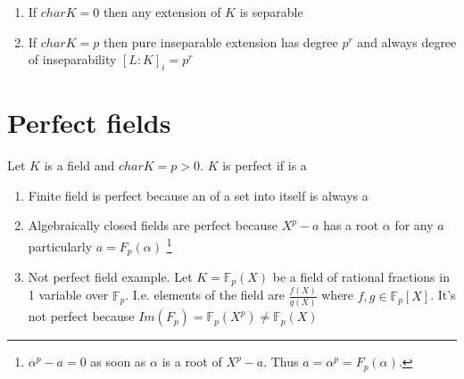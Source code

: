 \begin{remark}
  \begin{enumerate}
  \item If $char K = 0$ then any extension of $K$ is separable
  \item If $char K = p$ then pure inseparable extension has degree
    $p^r$ and always degree of inseparability
    $\left[L:K\right]_i = p^r$
  \end{enumerate}
\end{remark}

\section{Perfect fields}

\begin{definition}
  Let $K$ is a field and $char K = p > 0$. $K$ is perfect if
   is a 
  \label{def:perfectfield}
\end{definition}

\begin{example}
  \begin{enumerate}
    \item Finite field is perfect because an 
      of a set into itself is always a 
    \item Algebraically closed fields are perfect because
      $X^p - a$ has a root $\alpha$ for any $a$ particularly
      $a = F_p\left(\alpha\right)$
      \footnote{
        $\alpha^p -a =0$ as soon as $\alpha$ is a root of $X^p - a$.
        Thus $a = \alpha^p = F_p\left(\alpha\right)$.
      }
    \item Not perfect field example. Let
      $K=\mathbb{F}_p\left(X\right)$ be a field of rational fractions
      in 1 variable over $\mathbb{F}_p$. I.e. elements of the field
      are $\frac{f(X)}{g(X)}$ where
      $f,g \in \mathbb{F}_p\left[X\right]$. It's not perfect because
      $Im\left(F_p\right) = \mathbb{F}_p\left(X^p\right) \ne
      \mathbb{F}_p\left(X\right)$ \label{ex:lec3_notperfect}
  \end{enumerate}
  \label{ex:lec3_1}
\end{example}

